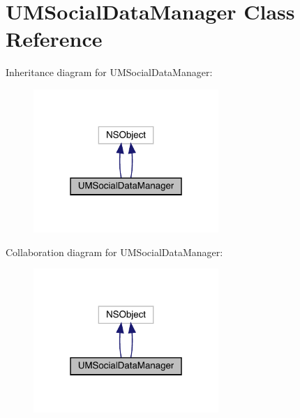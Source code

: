 \hypertarget{interface_u_m_social_data_manager}{}\section{U\+M\+Social\+Data\+Manager Class Reference}
\label{interface_u_m_social_data_manager}


Inheritance diagram for U\+M\+Social\+Data\+Manager\+:\nopagebreak
\begin{figure}[H]
\begin{center}
\leavevmode
\includegraphics[width=199pt]{interface_u_m_social_data_manager__inherit__graph}
\end{center}
\end{figure}


Collaboration diagram for U\+M\+Social\+Data\+Manager\+:\nopagebreak
\begin{figure}[H]
\begin{center}
\leavevmode
\includegraphics[width=199pt]{interface_u_m_social_data_manager__coll__graph}
\end{center}
\end{figure}
